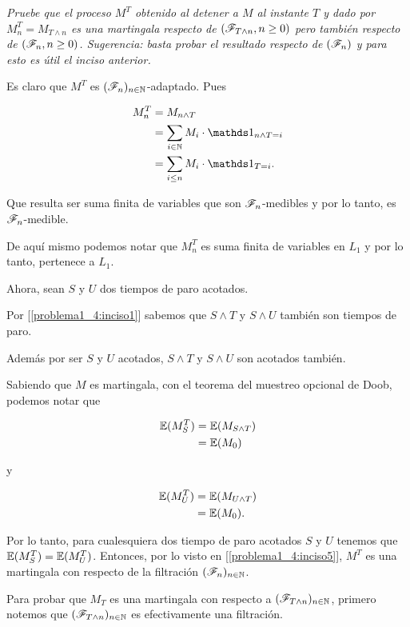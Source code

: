 \emph{
	Pruebe que el proceso $M^T$ obtenido al detener a $M$ al instante $T$ y dado por $M^T_n=M_{T\wedge n}$ es una 
	martingala respecto de $\left( \mathscr{F}_{T\wedge n},n\geq 0\right) $ pero tambi\'en respecto de $\left( \mathscr{F}_{n},n\geq 0\right) $. 
	Sugerencia: basta probar el resultado respecto de $\left( \mathscr{F}_n\right) $ y para esto es \'util el inciso anterior.
}

\afterstatement\pn

	Es claro que $M^T$ es $(\mathscr{F}_n)_{n \in \mathbb{N}}$-adaptado. Pues
    
	\begin{align}
		M_n^T 		&= 		M_{n \wedge T} 									        \\
					&= 		\sum_{i \in \N} M_i \cdot \indic_{n \wedge T = i}		\\
					&=      \sum_{i \leq n} M_i \cdot \indic_{T = i}.
	\end{align}\pn		

	Que resulta ser suma finita de variables que son $\mathscr{F}_n$-medibles y por lo tanto,
	es $\mathscr{F}_n$-medible.\pn
	
	De aquí mismo podemos notar que $M_n^T$ es suma finita de variables en $L_1$ y por
	lo tanto, pertenece a $L_1$.\pn
	
	Ahora, sean $S$ y $U$ dos tiempos de paro acotados.\pn
	
	Por [\ref{problema1_4:inciso1}] sabemos que $S \wedge T$ y $S \wedge U$ también son tiempos de paro.\pn
	
	Además por ser $S$ y $U$ acotados, $S \wedge T$ y $S \wedge U$ son acotados también.\pn

	Sabiendo que $M$ es martingala, con el teorema del muestreo opcional de Doob, podemos notar que
	
	\begin{align}
		\mathbb{E}(M_S^T) 	&=	\mathbb{E}(M_{S \wedge T})      \\
					&=  \mathbb{E}(M_0)
	\end{align}\pn
	
	y
	
	\begin{align}
		\mathbb{E}(M_U^T) 	&=	\mathbb{E}(M_{U \wedge T}) \\
					&= \mathbb{E}(M_0).
	\end{align}\pn
	
	Por lo tanto, para cualesquiera dos tiempo de paro acotados $S$ y $U$ tenemos que $\mathbb{E}(M_S^T) = \mathbb{E}(M_U^T)$.
	Entonces, por lo visto en [\ref{problema1_4:inciso5}], $M^T$ es una martingala con respecto de la filtración
	$(\mathscr{F}_n)_{n \in \mathbb{N}}$.\pn
	
	Para probar que $M_T$ es una martingala con respecto a $(\mathscr{F}_{T \wedge n})_{n \in \mathbb{N}}$, primero notemos que
	$(\mathscr{F}_{T \wedge n})_{n \in \mathbb{N}}$ es efectivamente una filtración.\pn
	
